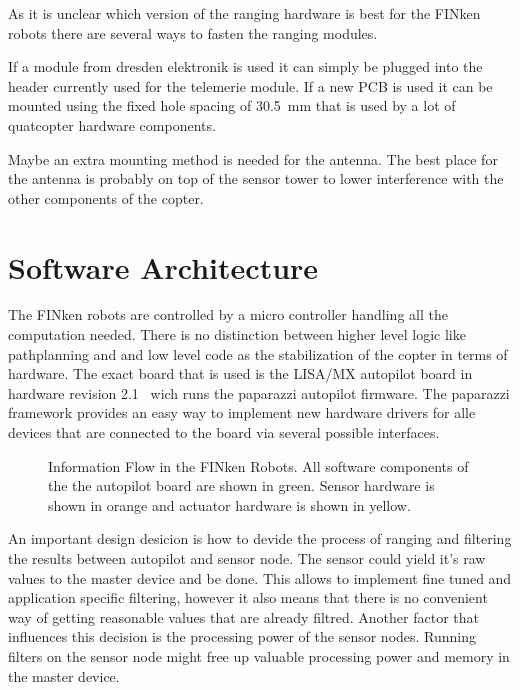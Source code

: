As it is unclear which version of the ranging hardware is best for the FINken robots there are several ways to fasten the ranging modules.

If a module from dresden elektronik is used it can simply be plugged into the header currently used for the telemerie module.
If a new PCB is used it can be mounted using the fixed hole spacing of \SI{30.5}{mm} that is used by a lot of quatcopter hardware components.

Maybe an extra mounting method is needed for the antenna.
The best place for the antenna is probably on top of the sensor tower to lower interference with the other components of the copter.

\section{Software Architecture}
The FINken robots are controlled by a micro controller handling all the computation needed.
There is no distinction between higher level logic like pathplanning and and low level code as the stabilization of the copter in terms of hardware.
The exact board that is used is the LISA/MX autopilot board in hardware revision 2.1~\cite{lisamx} wich runs the paparazzi autopilot firmware\cite{paparazzi}.
The paparazzi framework provides an easy way to implement new hardware drivers for alle devices that are connected to the board via several possible interfaces.

\begin{figure}[H]
	\centering	
	\label{flow}
	\caption[ Information Flow in the FINken Robots ]
	{Information Flow in the FINken Robots. 
	All software components of the the autopilot board are shown in green.
	Sensor hardware is shown in orange and actuator hardware is shown in yellow.}
\end{figure}

 

An important design desicion is how to devide the process of ranging and filtering the results between autopilot and sensor node.
The sensor could yield it's raw values to the master device and be done.
This allows to implement fine tuned and application specific filtering, however it also means that there is no convenient way of getting reasonable values that are already filtred.
Another factor that influences this decision is the processing power of the sensor nodes.
Running filters on the sensor node might free up valuable processing power and memory in the master device.

